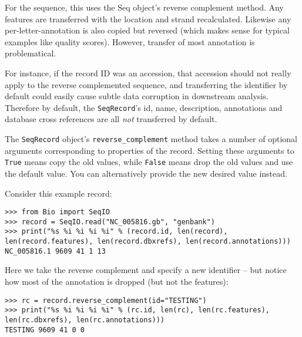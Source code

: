 For the sequence, this uses the Seq object's reverse complement method. Any
features are transferred with the location and strand recalculated. Likewise
any per-letter-annotation is also copied but reversed (which makes sense for
typical examples like quality scores). However, transfer of most annotation
is problematical.

For instance, if the record ID was an accession, that accession should not really
apply to the reverse complemented sequence, and transferring the identifier by
default could easily cause subtle data corruption in downstream analysis.
Therefore by default, the \verb|SeqRecord|'s id, name, description, annotations
and database cross references are all \emph{not} transferred by default.

The \verb|SeqRecord| object's \verb|reverse_complement| method takes a number
of optional arguments corresponding to properties of the record. Setting these
arguments to \verb|True| means copy the old values, while \verb|False| means
drop the old values and use the default value. You can alternatively provide
the new desired value instead.

Consider this example record:

\begin{verbatim}
>>> from Bio import SeqIO
>>> record = SeqIO.read("NC_005816.gb", "genbank")
>>> print("%s %i %i %i %i" % (record.id, len(record), len(record.features), len(record.dbxrefs), len(record.annotations)))
NC_005816.1 9609 41 1 13
\end{verbatim}

Here we take the reverse complement and specify a new identifier -- but notice
how most of the annotation is dropped (but not the features):

\begin{verbatim}
>>> rc = record.reverse_complement(id="TESTING")
>>> print("%s %i %i %i %i" % (rc.id, len(rc), len(rc.features), len(rc.dbxrefs), len(rc.annotations)))
TESTING 9609 41 0 0
\end{verbatim}
